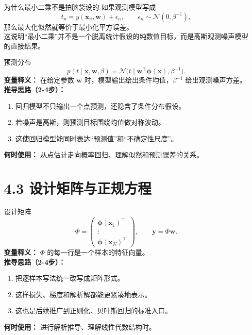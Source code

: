 ﻿\documentclass[11pt]{article}
\begin{document}
\begin{derivationbox}{为什么最小二乘不是拍脑袋设的}
如果观测模型写成
\[
t_n = y(\mathbf x_n,\mathbf w)+\epsilon_n,
\qquad \epsilon_n\sim\mathcal N(0,\beta^{-1}),
\]
那么最大化似然就等价于最小化平方误差。\\
这说明“最小二乘”并不是一个脱离统计假设的纯数值目标，而是高斯观测噪声模型的直接结果。
\end{derivationbox}

\begin{formulabox}{预测分布}
\begin{equation}
p(t\mid \mathbf x,\mathbf w,\beta)=\mathcal N\bigl(t\mid \mathbf w^\top\boldsymbol\phi(\mathbf x),\beta^{-1}\bigr).
\end{equation}
\textbf{变量释义：} 在给定参数 $\mathbf w$ 时，模型输出给出条件均值，$\beta^{-1}$ 给出观测噪声方差。\\
\textbf{推导思路（2-4步）：}
\begin{enumerate}[leftmargin=1.6em]
\item 回归模型不只输出一个点预测，还隐含了条件分布假设。
\item 若噪声是高斯，则预测目标围绕均值做对称波动。
\item 这使回归模型能同时表达“预测值”和“不确定性尺度”。
\end{enumerate}
\textbf{何时使用：} 从点估计走向概率回归、理解似然和预测误差的关系。
\end{formulabox}
\section{4.3 设计矩阵与正规方程}
\begin{formulabox}{设计矩阵}
\begin{equation}
\Phi=
\begin{pmatrix}
\boldsymbol\phi(\mathbf x_1)^\top \\
\vdots \\
\boldsymbol\phi(\mathbf x_N)^\top
\end{pmatrix},
\qquad
\mathbf y = \Phi \mathbf w.
\end{equation}
\textbf{变量释义：} $\Phi$ 的每一行是一个样本的特征向量。\\
\textbf{推导思路（2-4步）：}
\begin{enumerate}[leftmargin=1.6em]
  \item 把逐样本写法统一改写成矩阵形式。
  \item 这样损失、梯度和解析解都能更紧凑地表示。
  \item 这也是后续推广到正则化、贝叶斯回归的标准入口。
\end{enumerate}
\textbf{何时使用：} 进行解析推导、理解线性代数结构时。
\end{formulabox}
\end{document}

